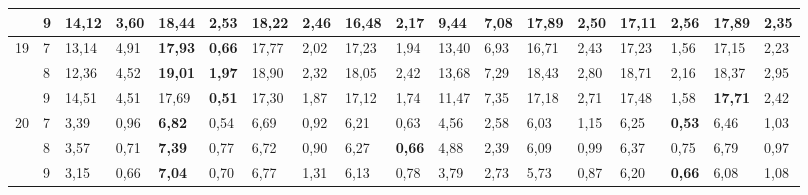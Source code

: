 \documentclass[conference]{IEEEtran}
\begin{document}
\begin{table*}[]
\begin{tabular}{|cl|ll|ll|ll|ll|ll|ll|ll|ll|}
		\multicolumn{1}{|c|}{} & 9 & \multicolumn{1}{l|}{14,12} & 3,60 & \multicolumn{1}{l|}{\textbf{18,44}} & 2,53 & \multicolumn{1}{l|}{18,22} & 2,46 & \multicolumn{1}{l|}{16,48} & \textbf{2,17} & \multicolumn{1}{l|}{9,44} & 7,08 & \multicolumn{1}{l|}{17,89} & 2,50 & \multicolumn{1}{l|}{17,11} & 2,56 & \multicolumn{1}{l|}{17,89} & 2,35 \\ \hline
		\multicolumn{1}{|c|}{\multirow{3}{*}{19}} & 7 & \multicolumn{1}{l|}{13,14} & 4,91 & \multicolumn{1}{l|}{\textbf{17,93}} & \textbf{0,66} & \multicolumn{1}{l|}{17,77} & 2,02 & \multicolumn{1}{l|}{17,23} & 1,94 & \multicolumn{1}{l|}{13,40} & 6,93 & \multicolumn{1}{l|}{16,71} & 2,43 & \multicolumn{1}{l|}{17,23} & 1,56 & \multicolumn{1}{l|}{17,15} & 2,23 \\ \cline{2-18} 
		\multicolumn{1}{|c|}{} & 8 & \multicolumn{1}{l|}{12,36} & 4,52 & \multicolumn{1}{l|}{\textbf{19,01}} & \textbf{1,97} & \multicolumn{1}{l|}{18,90} & 2,32 & \multicolumn{1}{l|}{18,05} & 2,42 & \multicolumn{1}{l|}{13,68} & 7,29 & \multicolumn{1}{l|}{18,43} & 2,80 & \multicolumn{1}{l|}{18,71} & 2,16 & \multicolumn{1}{l|}{18,37} & 2,95 \\ \cline{2-18} 
		\multicolumn{1}{|c|}{} & 9 & \multicolumn{1}{l|}{14,51} & 4,51 & \multicolumn{1}{l|}{17,69} & \textbf{0,51} & \multicolumn{1}{l|}{17,30} & 1,87 & \multicolumn{1}{l|}{17,12} & 1,74 & \multicolumn{1}{l|}{11,47} & 7,35 & \multicolumn{1}{l|}{17,18} & 2,71 & \multicolumn{1}{l|}{17,48} & 1,58 & \multicolumn{1}{l|}{\textbf{17,71}} & 2,42 \\ \hline
		\multicolumn{1}{|c|}{\multirow{3}{*}{20}} & 7 & \multicolumn{1}{l|}{3,39} & 0,96 & \multicolumn{1}{l|}{\textbf{6,82}} & 0,54 & \multicolumn{1}{l|}{6,69} & 0,92 & \multicolumn{1}{l|}{6,21} & 0,63 & \multicolumn{1}{l|}{4,56} & 2,58 & \multicolumn{1}{l|}{6,03} & 1,15 & \multicolumn{1}{l|}{6,25} & \textbf{0,53} & \multicolumn{1}{l|}{6,46} & 1,03 \\ \cline{2-18} 
		\multicolumn{1}{|c|}{} & 8 & \multicolumn{1}{l|}{3,57} & 0,71 & \multicolumn{1}{l|}{\textbf{7,39}} & 0,77 & \multicolumn{1}{l|}{6,72} & 0,90 & \multicolumn{1}{l|}{6,27} & \textbf{0,66} & \multicolumn{1}{l|}{4,88} & 2,39 & \multicolumn{1}{l|}{6,09} & 0,99 & \multicolumn{1}{l|}{6,37} & 0,75 & \multicolumn{1}{l|}{6,79} & 0,97 \\ \cline{2-18} 
		\multicolumn{1}{|c|}{} & 9 & \multicolumn{1}{l|}{3,15} & 0,66 & \multicolumn{1}{l|}{\textbf{7,04}} & 0,70 & \multicolumn{1}{l|}{6,77} & 1,31 & \multicolumn{1}{l|}{6,13} & 0,78 & \multicolumn{1}{l|}{3,79} & 2,73 & \multicolumn{1}{l|}{5,73} & 0,87 & \multicolumn{1}{l|}{6,20} & \textbf{0,66} & \multicolumn{1}{l|}{6,08} & 1,08 \\ \hline
	\end{tabular}
\end{table*}
\end{document}
